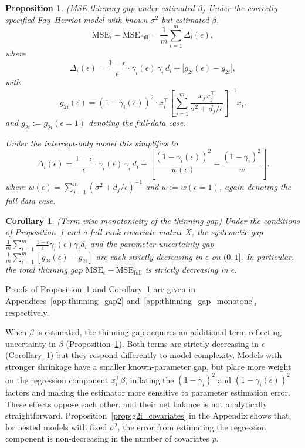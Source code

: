 \documentclass[11pt]{article}
\newcommand{\msethin}{\mathrm{MSE}_{\epsilon}}
\newcommand{\msefull}{\mathrm{MSE}_{\mathrm{full}}}
\theoremstyle{plain}
\newtheorem{proposition}[theorem]{Proposition}
\newtheorem{corollary}[theorem]{Corollary}
\theoremstyle{definition}
\theoremstyle{remark}
\begin{document}
\begin{proposition}
\label{prop:thinning_gap2}
(MSE thinning gap under estimated $\beta$) Under the correctly specified Fay--Herriot model with known $\sigma^2$ but estimated $\beta$,
\[\msethin - \msefull = \frac{1}{m} \sum_{i=1}^m \Delta_i(\epsilon),\]
where
$$\Delta_i(\epsilon) = \frac{1-\epsilon}{\epsilon} \cdot \gamma_i(\epsilon) \, \gamma_i \, d_i + \big[g_{2i}(\epsilon) - g_{2i}\big],$$
with
$$g_{2i}(\epsilon) = (1-\gamma_i(\epsilon))^2 \cdot x_i^\top \left[\sum_{j=1}^m \frac{x_j x_j^\top}{\sigma^2 + d_j/\epsilon}\right]^{-1} x_i.$$
and $g_{2i} := g_{2i}(\epsilon=1)$ denoting the full-data case.

Under the intercept-only model this simplifies to
$$\Delta_i(\epsilon) = \frac{1-\epsilon}{\epsilon} \cdot \gamma_i(\epsilon) \, \gamma_i \, d_i + \left[\frac{(1-\gamma_i(\epsilon))^2}{w(\epsilon)} - \frac{(1-\gamma_i)^2}{w}\right].$$
where $w(\epsilon) = \sum_{j=1}^m (\sigma^2 + d_j/\epsilon)^{-1}$ and $w := w(\epsilon=1)$, again denoting the full-data case.
\end{proposition}

\begin{corollary}
\label{cor:thinning_gap_monotone}
(Term-wise monotonicity of the thinning gap) Under the conditions of Proposition~\ref{prop:thinning_gap2} and a full-rank covariate matrix $X$, the systematic gap $\frac{1}{m}\sum_{i=1}^m \tfrac{1-\epsilon}{\epsilon}\gamma_i(\epsilon)\gamma_i d_i$ and the parameter-uncertainty gap $\frac{1}{m}\sum_{i=1}^m [g_{2i}(\epsilon) - g_{2i}]$ are each strictly decreasing in $\epsilon$ on $(0,1]$. In particular, the total thinning gap $\msethin - \msefull$ is strictly decreasing in $\epsilon$.
\end{corollary}
Proofs of Proposition~\ref{prop:thinning_gap2} and Corollary~\ref{cor:thinning_gap_monotone} are given in Appendices~\ref{app:thinning_gap2} and~\ref{app:thinning_gap_monotone}, respectively.


When $\beta$ is estimated, the thinning gap acquires an additional term reflecting uncertainty in $\beta$ (Proposition~\ref{prop:thinning_gap2}). Both terms are strictly decreasing in $\epsilon$ (Corollary~\ref{cor:thinning_gap_monotone}) but they respond differently to model complexity. Models with stronger shrinkage have a smaller known-parameter gap, but place more weight on the regression component $x_i^\top\tilde{\beta}$, inflating the $(1-\gamma_i)^2$ and $(1-\gamma_i(\epsilon))^2$ factors and making the estimator more sensitive to parameter estimation error. These effects oppose each other, and their net balance is not analytically straightforward. Proposition~\ref{prop:g2i_covariates} in the Appendix shows that, for nested models with fixed $\sigma^2$, the error from estimating the regression component is non-decreasing in the number of covariates $p$.
\end{document}
